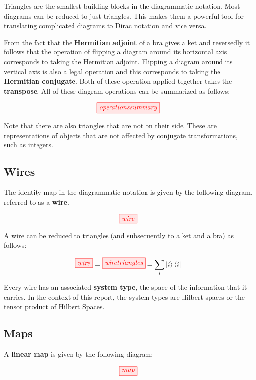 \documentclass[]{article}
\begin{document}
Triangles are the smallest building blocks in the diagrammatic notation. Most diagrams can be reduced to just triangles. This makes them a powerful tool for translating complicated diagrams to Dirac notation and vice versa.

From the fact that the \textbf{Hermitian adjoint} of a bra gives a ket and reversedly it follows that the operation of flipping a diagram around its horizontal axis corresponds to taking the Hermitian adjoint. Flipping a diagram around its vertical axis is also a legal operation and this corresponds to taking the \textbf{Hermitian conjugate}. Both of these operation applied together takes the \textbf{transpose}. All of these diagram operations can be summarized as follows:

\begin{equation}
\tikzfig{operationssummary}
\end{equation}

Note that there are also triangles that are not on their side. These are representations of objects that are not affected by conjugate transformations, such as integers.
\subsection{Wires}
\label{identity}
The identity map in the diagrammatic notation is given by the following diagram, referred to as a \textbf{wire}.

\begin{equation}
\tikzfig{wire}
\end{equation}

A wire can be reduced to triangles (and subsequently to a ket and a bra) as follows: 

\begin{equation}
\tikzfig{wire} = \tikzfig{wiretriangles} = \sum_{i}\ket{i}\bra{i}
\end{equation}

Every wire has an associated \textbf{system type}, the space of the information that it carries. In the context of this report, the system types are Hilbert spaces or the tensor product of Hilbert Spaces. 

\subsection{Maps}
\label{maps}

A \textbf{linear map} is given by the following diagram:

\begin{equation}
\tikzfig{map}
\end{equation}
\end{document}
